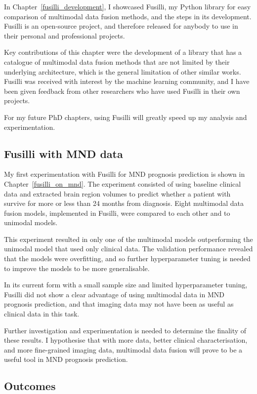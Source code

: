 In Chapter~\ref{fusilli_development}, I showcased Fusilli, my Python library for easy comparison of multimodal data fusion methods, and the steps in its development.
Fusilli is an open-source project, and therefore released for anybody to use in their personal and professional projects.

Key contributions of this chapter were the development of a library that has a catalogue of multimodal data fusion methods that are not limited by their underlying architecture, which is the general limitation of other similar works.
Fusilli was received with interest by the machine learning community, and I have been given feedback from other researchers who have used Fusilli in their own projects.

For my future PhD chapters, using Fusilli will greatly speed up my analysis and experimentation.

\subsection{Fusilli with MND data}

My first experimentation with Fusilli for MND prognosis prediction is shown in Chapter~\ref{fusilli_on_mnd}.
The experiment consisted of using baseline clinical data and extracted brain region volumes to predict whether a patient with survive for more or less than 24 months from diagnosis.
Eight multimodal data fusion models, implemented in Fusilli, were compared to each other and to unimodal models.

This experiment resulted in only one of the multimodal models outperforming the unimodal model that used only clinical data.
The validation performance revealed that the models were overfitting, and so further hyperparameter tuning is needed to improve the models to be more generalisable.

In its current form with a small sample size and limited hyperparameter tuning, Fusilli did not show a clear advantage of using multimodal data in MND prognosis prediction, and that imaging data may not have been as useful as clinical data in this task.

Further investigation and experimentation is needed to determine the finality of these results.
I hypothesise that with more data, better clinical characterisation, and more fine-grained imaging data, multimodal data fusion will prove to be a useful tool in MND prognosis prediction.

\subsection{Outcomes}

